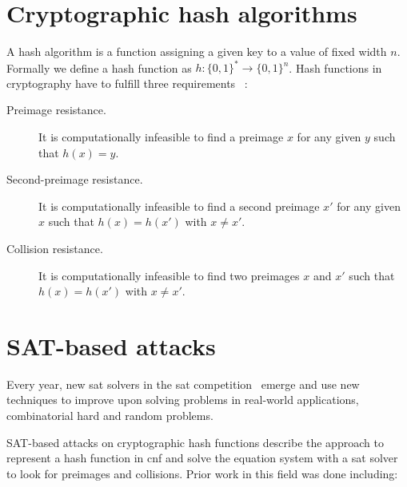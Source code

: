 \section{Cryptographic hash algorithms}
\label{sec:hashalgs}
%
A hash algorithm is a function assigning a given key to a value of fixed width $n$. Formally we define a hash function as $h: \{0, 1\}^* \rightarrow \{0, 1\}^n$. Hash functions in cryptography have to fulfill three requirements%
~\cite[2]{Cry02}:
%
\begin{description}
  \item[Preimage resistance.] It is computationally infeasible to find a preimage
    $x$ for any given $y$ such that $h(x) = y$.
  \item[Second-preimage resistance.] It is computationally infeasible to find a
    second preimage $x'$ for any given $x$ such that $h(x) = h(x')$ with $x \neq x'$.
  \item[Collision resistance.] It is computationally infeasible to find two preimages
    $x$ and $x'$ such that $h(x) = h(x')$ with $x \neq x'$.
\end{description}

\section{SAT-based attacks}
\label{sec:sat_attacks}
%
Every year, new \gls{sat} solvers in the \gls{sat} competition~\cite{Sat21} emerge and use new techniques to improve upon solving problems in real-world applications, combinatorial hard and random problems.

SAT-based attacks on cryptographic hash functions describe the approach to represent a hash function in \gls{cnf} and solve the equation system with a \gls{sat} solver to look for preimages and collisions. Prior work in this field was done including:

